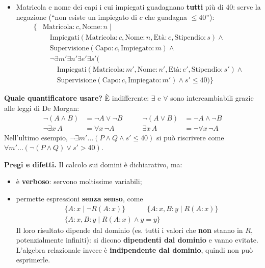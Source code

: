 \documentclass[12pt]{extarticle}
\begin{document}
\begin{itemize}
\[\begin{aligned}
    \end{aligned}
    \]
    \item Matricola e nome dei capi i cui impiegati guadagnano \textbf{tutti} più di 40: serve la negazione (``non esiste un impiegato di $c$ che guadagna $\leq 40$''):
    \[
    \begin{aligned}
    \{ & \text{Matricola}: c, \text{Nome}: n \mid \\
    & \quad \text{Impiegati}(\text{Matricola}: c, \text{Nome}: n, \text{Età}: e, \text{Stipendio}: s) \wedge {} \\
    & \quad \text{Supervisione}(\text{Capo}: c, \text{Impiegato}: m) \wedge {} \\
    & \quad \neg \exists m' \exists n' \exists e' \exists s' \big( \\
    & \qquad \text{Impiegati}(\text{Matricola}: m', \text{Nome}: n', \text{Età}: e', \text{Stipendio}: s') \wedge {} \\
    & \qquad \text{Supervisione}(\text{Capo}: c, \text{Impiegato}: m') \wedge s' \leq 40\big) \}
    \end{aligned}
    \]
\end{itemize}

\noindent \textbf{Quale quantificatore usare?} È indifferente: $\exists$ e $\forall$ sono intercambiabili grazie alle leggi di De Morgan:
\[
\begin{aligned}
\neg(A \wedge B) &= \neg A \vee \neg B & \qquad \neg(A \vee B) &= \neg A \wedge \neg B \\
\neg \exists x\, A &= \forall x\, \neg A & \qquad \exists x\, A &= \neg \forall x\, \neg A
\end{aligned}
\]
Nell'ultimo esempio, $\neg \exists m' \dots (P \wedge Q \wedge s' \leq 40)$ si può riscrivere come $\forall m' \dots (\neg(P \wedge Q) \vee s' > 40)$.

\medskip
\noindent \textbf{Pregi e difetti.} Il calcolo sui domini è dichiarativo, ma:
\begin{itemize}
    \item è \textbf{verboso}: servono moltissime variabili;
    \item permette espressioni \textbf{senza senso}, come
    \[
    \begin{aligned}
    & \{ A: x \mid \neg R(A: x) \} \qquad\quad \{ A: x, B: y \mid R(A: x) \} \\
    & \{ A: x, B: y \mid R(A: x) \wedge y = y \}
    \end{aligned}
    \]
    Il loro risultato dipende dal dominio (es. tutti i valori che \textbf{non} stanno in $R$, potenzialmente infiniti): si dicono \textbf{dipendenti dal dominio} e vanno evitate. L'algebra relazionale invece è \textbf{indipendente dal dominio}, quindi non può esprimerle.
\end{itemize}
\end{document}
